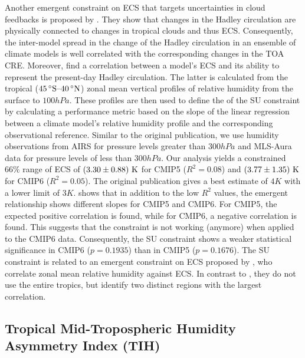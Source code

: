 Another emergent constraint on \ac{ECS} that targets uncertainties in cloud
feedbacks is proposed by \textcite{Su2014}. They show that changes in the
Hadley circulation are physically connected to changes in tropical clouds and
thus \ac{ECS}. Consequently, the inter-model spread in the change of the Hadley
circulation in an ensemble of climate models is well correlated with the
corresponding changes in the \ac{TOA} \ac{CRE}. Moreover, \textcite{Su2014}
find a correlation between a model's \ac{ECS} and its ability to represent the
present-day Hadley circulation. The latter is calculated from the tropical
($\range{45 \unit{\degree S}}{40 \unit{\degree N}}$) zonal mean vertical
profiles of relative humidity from the surface to $100 \unit{hPa}$. These
profiles are then used to define the \xaxis{} of the SU constraint by
calculating a performance metric based on the slope of the linear regression
between a climate model's relative humidity profile and the corresponding
observational reference. Similar to the original publication, we use humidity
observations from AIRS \autocite{Aumann2003} for pressure levels greater than
$300 \unit{hPa}$ and MLS-Aura data \autocite{Beer2006} for pressure levels of
less than $300 \unit{hPa}$. Our analysis yields a constrained $66 \unit{\%}$
range of \ac{ECS} of $\pmrangeunit{3.30}{0.88}{K}$ for \acs{CMIP}5 ($R^2 =
0.08$) and $\pmrangeunit{3.77}{1.35}{K}$ for \acs{CMIP}6 ($R^2 = 0.05$). The
original publication gives a best estimate of $4 \unit{K}$ with a lower limit
of $3 \unit{K}$.  shows that in addition to the low
$R^2$ values, the emergent relationship shows different slopes for \acs{CMIP}5
and \acs{CMIP}6. For \acs{CMIP}5, the expected positive correlation is found,
while for \acs{CMIP}6, a negative correlation is found. This suggests that the
constraint is not working (anymore) when applied to the \acs{CMIP}6 data.
Consequently, the SU constraint shows a weaker statistical significance in
\acs{CMIP}6 ($p = 0.1935$) than in \acs{CMIP}5 ($p = 0.1676$). The SU
constraint is related to an emergent constraint on \ac{ECS} proposed by
\textcite{Fasullo2012}, who correlate  zonal mean relative
humidity against \ac{ECS}. In contrast to \textcite{Su2014}, they do not use
the entire tropics, but identify two distinct regions with the largest
correlation.


\subsection{Tropical Mid-Tropospheric Humidity Asymmetry Index (TIH)}
\label{subsec:05:tih}

